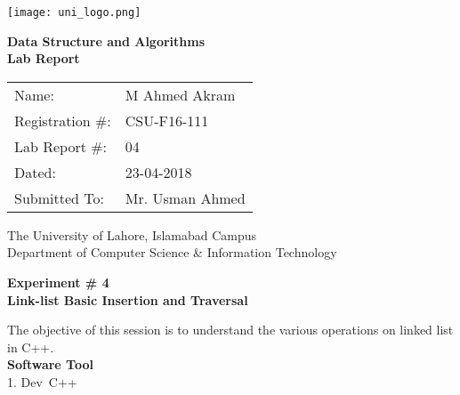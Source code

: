 \documentclass[11pt]{article}            %
\begin{document}
\begin{titlepage}
    \centering
  \vfill
    \texttt{[image: uni\_logo.png]} \\ 
	\vskip2cm
    {\bfseries\Large
	Data Structure and Algorithms \\ 
	
	\vskip2cm
	Lab Report 
	 
	\vskip2cm
	}    

\begin{center}
\begin{tabular}{ l l  } 

Name: & M Ahmed Akram \\ 
Registration \#: & CSU-F16-111 \\ 
Lab Report \#: & 04 \\ 
 Dated:& 23-04-2018\\ 
Submitted To:& Mr. Usman Ahmed\\ 

\end{tabular}
\end{center}
    \vfill
    The University of Lahore, Islamabad Campus\\
Department of Computer Science \& Information Technology
\end{titlepage}


    
    {\bfseries\Large
\centering
	Experiment \# 4 \\

Link-list Basic Insertion and Traversal   \\
	
	}    
 \vskip1cm

The objective of this session is to understand the various operations on linked list in C++.\\

\textbf {Software Tool} \\
1.   Dev\ C++
\end{document}
